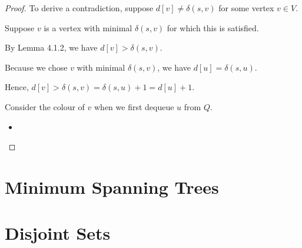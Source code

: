 \begin{proof}
    To derive a contradiction, suppose $d[v] \neq \delta(s, v)$ for some vertex $v \in V$.

    Suppose $v$ is a vertex with minimal $\delta(s, v)$ for which this is satisfied.

    By Lemma 4.1.2, we have $d[v] > \delta(s, v)$.


    Because we chose $v$ with minimal $\delta(s, v)$, we have $d[u] = \delta(s, u)$.

    Hence, $d[v] > \delta(s, v) = \delta(s, u) + 1 = d[u] + 1$.

    Consider the colour of $v$ when we first dequeue $u$ from $Q$.

    \begin{itemize}
        \item 
    \end{itemize}
\end{proof}

\section{Minimum Spanning Trees}

\section{Disjoint Sets}